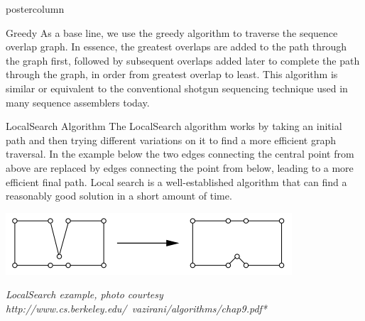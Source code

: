 \documentclass[final,hyperref={pdfpagelabels=false}]{beamer}
\begin{document}
\begin{frame}
\begin{columns}
\begin{column}{.32\textwidth}
\begin{beamercolorbox}[center,wd=\textwidth]{postercolumn}
\begin{minipage}[T]{.95\textwidth}
{\begin{block}{Greedy}
                            As a base line, we use the greedy algorithm to
                            traverse the sequence overlap graph.  In essence,
                            the greatest overlaps are added to the path through
                            the graph first, followed by subsequent overlaps
                            added later to complete the path through the graph,
                            in order from greatest overlap to least.  This
                            algorithm is similar or equivalent to the
                            conventional shotgun sequencing technique used in
                            many sequence assemblers today.
                        \end{block}
                        \begin{block}{LocalSearch Algorithm}
                            The LocalSearch algorithm works by taking an
                            initial path and then trying different variations
                            on it to find a more efficient graph traversal.  In
                            the example below the two edges connecting the
                            central point from above are replaced by edges
                            connecting the point from below, leading to a more
                            efficient final path.  Local search is a
                            well-established algorithm that can find a
                            reasonably good solution in a short amount of time.
                            \begin{center}
                                \includegraphics[scale=1.5]{localsearch_example}
                            \end{center}
                            {\em {\small LocalSearch example, photo courtesy http://www.cs.berkeley.edu/~vazirani/algorithms/chap9.pdf*} } \\


\end{block}}
\end{minipage}
\end{beamercolorbox}
\end{column}
\end{columns}
\end{frame}
\end{document}
